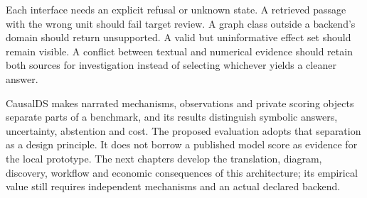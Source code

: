 Each interface needs an explicit refusal or unknown state. A retrieved passage
with the wrong unit should fail target review. A graph class outside a backend's
domain should return unsupported. A valid but uninformative effect set should
remain visible. A conflict between textual and numerical evidence should retain
both sources for investigation instead of selecting whichever yields a cleaner
answer.

CausalDS makes narrated mechanisms, observations and private scoring objects
separate parts of a benchmark, and its results distinguish symbolic answers,
uncertainty, abstention and cost.\cite{v12_la_2607_08093} The proposed evaluation
adopts that separation as a design principle. It does not borrow a published
model score as evidence for the local prototype. The next chapters develop the
translation, diagram, discovery, workflow and economic consequences of this
architecture; its empirical value still requires independent mechanisms and
an actual declared backend.
